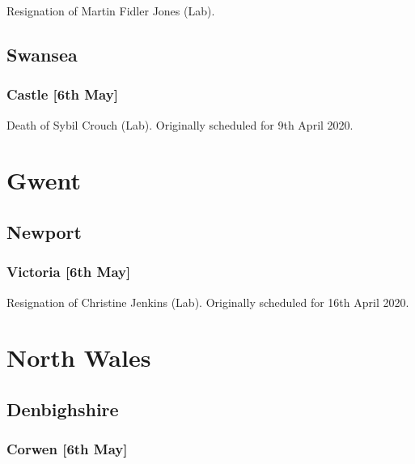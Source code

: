 \documentclass[a4paper,openany]{book}
\begin{document}
\begin{resultsiii}

Resignation of Martin Fidler Jones (Lab).

\subsection*{Swansea}

\subsubsection*{Castle \hspace*{\fill}\nolinebreak[1]%
	\enspace\hspace*{\fill}
	[6th May]}


Death of Sybil Crouch (Lab).  Originally scheduled for 9th April 2020.

\section{Gwent}

\subsection*{Newport}

\subsubsection*{Victoria \hspace*{\fill}\nolinebreak[1]%
	\enspace\hspace*{\fill}
	[6th May]}


Resignation of Christine Jenkins (Lab).  Originally scheduled for 16th April 2020.

\section{North Wales}

\subsection*{Denbighshire}

\subsubsection*{Corwen \hspace*{\fill}\nolinebreak[1]%
	\enspace\hspace*{\fill}
	[6th May]}


\end{resultsiii}
\end{document}
